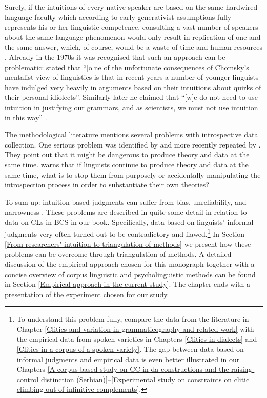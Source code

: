 Surely, if the intuitions of every native speaker are based on the same hardwired language faculty which according to early generativist assumptions fully represents his or her linguistic competence, consulting a vast number of speakers about the same language phenomenon would only result in replication of one and the same answer, which, of course, would be a waste of time and human resources \citep[85]{BuchstallerKhattab13}. Already in the 1970s it was recognised that such an approach can be problematic: \citet[74]{Sampson75} stated that ``[o]ne of the unfortunate consequences of Chomsky’s mentalist view of linguistics is that in recent years a number of younger linguists have indulged very heavily in arguments based on their intuitions about quirks of their personal idiolects''. Similarly later he claimed that ``[w]e do not need to use intuition in justifying our grammars, and as scientists, we must not use intuition in this way'' \citep[135]{Sampson01}. 

The methodological literature mentions several problems with introspective data \textcolor{black}{collection}. One serious problem was identified by \citet[199]{Labov72} and more recently repeated by \citet{Schutze16}. They point out that it might be dangerous to produce theory and data at the same time. \citet[5]{Schutze16} warns that if linguists continue to produce theory and data at the same time, what is to stop them from purposely or accidentally manipulating the introspection process in order to substantiate their own theories?

To sum up: intuition-based judgments can suffer from bias, unreliability, and narrowness \citep{Schutze16}. These problems are described in quite some detail in relation to data on CLs in BCS in our book. Specifically, data based on linguists’ informal judgments very often turned out to be contradictory and flawed.\footnote{To understand this problem fully, compare the data from the literature in Chapter \ref{Clitics and variation in grammaticography and related work} with the empirical data from spoken varieties in Chapters \ref{Clitics in dialects} and \ref{Clitics in a corpus of a spoken variety}. The gap between data based on informal judgments and empirical data is even better illustrated in our Chapters \ref{A corpus-based study on CC in da constructions and the raising-control distinction (Serbian)}--\ref{Experimental study on constraints on clitic climbing out of infinitive complements}.} In Section \ref{From researchers' intuition to triangulation of methods} we present how these problems can be overcome through triangulation of methods. A detailed discussion of the empirical approach chosen for this monograph together with a concise overview of corpus linguistic and psycholinguistic methods can be found in Section \ref{Empirical approach in the current study}. The chapter ends with a presentation of the experiment chosen for our study.


